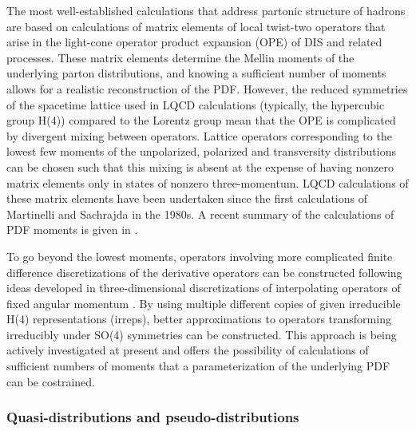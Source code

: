 The most well-established calculations that address partonic structure of hadrons are based on calculations of matrix elements of local twist-two operators that arise in the light-cone operator product expansion (OPE) of DIS and related processes. These matrix elements determine the Mellin moments of the underlying parton distributions, and knowing a sufficient number of moments allows for a realistic reconstruction of the PDF. However, the reduced symmetries of the spacetime lattice used in LQCD calculations (typically, the hypercubic group H(4)) compared to the Lorentz group mean that the OPE is complicated by divergent mixing between operators.
Lattice operators corresponding to the lowest few moments of the unpolarized, polarized and transversity distributions can be chosen such that this mixing is absent at the expense of having nonzero matrix elements only in states of nonzero three-momentum. LQCD calculations of these matrix elements have been undertaken since the first calculations of Martinelli and Sachrajda \cite{Dawson:1997ic} in the 1980s. A recent summary of the calculations of PDF moments is given in \cite{Lin:2017snn}.
	
To go beyond the lowest moments, operators involving more complicated finite difference discretizations of the derivative operators can be constructed following ideas developed in three-dimensional discretizations of interpolating operators of fixed angular momentum \cite{}. By using multiple different copies of given irreducible H(4) representations (irreps), better approximations to operators transforming irreducibly under SO(4) symmetries can be constructed. This approach is being actively investigated at present and offers the possibility of calculations of sufficient numbers of moments that a parameterization of the underlying PDF can be costrained.



\subsubsection{Quasi-distributions and pseudo-distributions}


